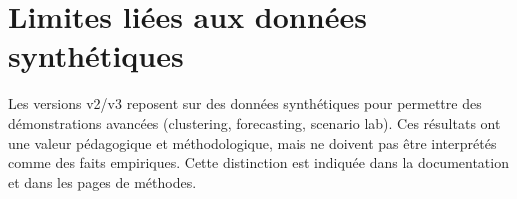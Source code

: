 \section{Limites liées aux données synthétiques}
Les versions v2/v3 reposent sur des données synthétiques pour permettre des démonstrations avancées (clustering, forecasting, scenario lab). Ces résultats ont une valeur pédagogique et méthodologique, mais ne doivent pas être interprétés comme des faits empiriques. Cette distinction est indiquée dans la documentation et dans les pages de méthodes.
